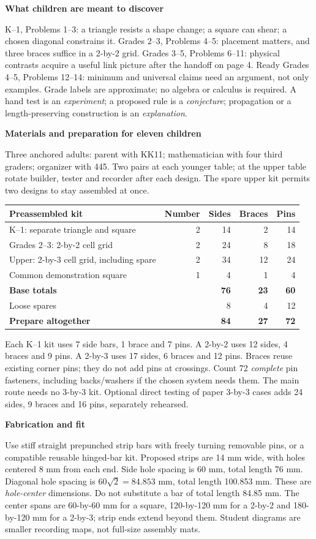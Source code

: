 \documentclass[letterpaper,11pt]{article}
\newcommand{\titleline}[1]{\par{\large\bfseries #1}\par}
\newcommand{\sub}[1]{\par\textbf{#1}\par}
\begin{document}
\sub{What children are meant to discover}
K--1, Problems 1--3: a triangle resists a shape change; a square can shear; a chosen diagonal constrains it. Grades 2--3, Problems 4--5: placement matters, and three braces suffice in a 2-by-2 grid. Grades 3--5, Problems 6--11: physical contrasts acquire a useful link picture after the handoff on page 4. Ready Grades 4--5, Problems 12--14: minimum and universal claims need an argument, not only examples. Grade labels are approximate; no algebra or calculus is required. A hand test is an \emph{experiment}; a proposed rule is a \emph{conjecture}; propagation or a length-preserving construction is an \emph{explanation}.

\newpage
\titleline{Materials and preparation for eleven children}
Three anchored adults: parent with KK11; mathematician with four third graders; organizer with 445. Two pairs at each younger table; at the upper table rotate builder, tester and recorder after each design. The spare upper kit permits two designs to stay assembled at once.

\begin{tabularx}{\linewidth}{@{}Xrrrr@{}}\textbf{Preassembled kit} &\textbf{Number}&\textbf{Sides}&\textbf{Braces}&\textbf{Pins}\\\hline
K--1: separate triangle and square &2&14&2&14\\
Grades 2--3: 2-by-2 cell grid &2&24&8&18\\
Upper: 2-by-3 cell grid, including spare &2&34&12&24\\
Common demonstration square &1&4&1&4\\\hline
\textbf{Base totals} &&\textbf{76}&\textbf{23}&\textbf{60}\\
Loose spares &&8&4&12\\
\textbf{Prepare altogether} &&\textbf{84}&\textbf{27}&\textbf{72}
\end{tabularx}

Each K--1 kit uses 7 side bars, 1 brace and 7 pins. A 2-by-2 uses 12 sides, 4 braces and 9 pins. A 2-by-3 uses 17 sides, 6 braces and 12 pins. Braces reuse existing corner pins; they do not add pins at crossings. Count 72 \emph{complete} pin fasteners, including backs/washers if the chosen system needs them. The main route needs no 3-by-3 kit. Optional direct testing of paper 3-by-3 cases adds 24 sides, 9 braces and 16 pins, separately rehearsed.

\sub{Fabrication and fit}
Use stiff straight prepunched strip bars with freely turning removable pins, or a compatible reusable hinged-bar kit. Proposed strips are 14 mm wide, with holes centered 8 mm from each end. Side hole spacing is 60 mm, total length 76 mm. Diagonal hole spacing is $60\sqrt2=84.853$ mm, total length 100.853 mm. These are \emph{hole-center} dimensions. Do not substitute a bar of total length 84.85 mm. The center spans are 60-by-60 mm for a square, 120-by-120 mm for a 2-by-2 and 180-by-120 mm for a 2-by-3; strip ends extend beyond them. Student diagrams are smaller recording maps, not full-size assembly mats.
\end{document}
